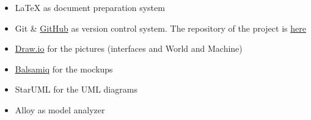 \begin{appendices}
		\begin{itemize}
			\item \LaTeX{} as document preparation system
			\item Git \& \href{https://github.com/}{GitHub} as version control system. The repository of the project is \href{https://github.com/Megapiro/PaccianiPiro}{here}
			\item \href{https://www.draw.io/}{Draw.io} for the pictures (interfaces and World and Machine)
			\item \href{https://balsamiq.com/}{Balsamiq} for the mockups
			\item StarUML for the UML diagrams
			\item Alloy as model analyzer
		\end{itemize}
	
\end{appendices}